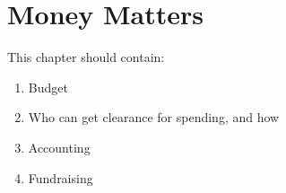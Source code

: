 \chapter{Money Matters}

This chapter should contain:
\begin{enumerate}
\item Budget
\item Who can get clearance for spending, and how
\item Accounting
\item Fundraising
\end{enumerate}
